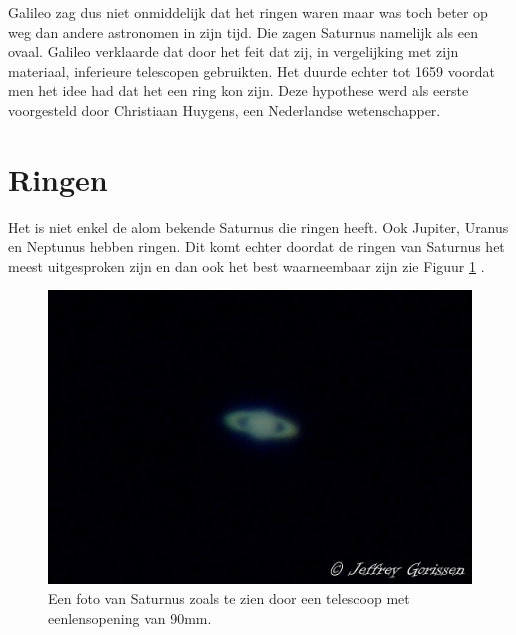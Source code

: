 \documentclass[a4paper]{article}
\begin{document}
\noindent
	Galileo zag dus niet onmiddelijk dat het ringen waren maar was toch beter op weg dan andere astronomen in zijn tijd.
	Die zagen Saturnus namelijk als een ovaal. Galileo verklaarde dat door het feit dat zij, in vergelijking met zijn materiaal,
	inferieure telescopen gebruikten. Het duurde echter tot 1659 voordat men het idee had
	dat het een ring kon zijn. Deze hypothese werd als eerste voorgesteld door Christiaan Huygens, een Nederlandse wetenschapper.
\section{Ringen}
Het is niet enkel de alom bekende Saturnus die ringen heeft. Ook Jupiter, Uranus en Neptunus hebben ringen. Dit komt echter doordat de ringen van Saturnus het meest uitgesproken zijn en
dan ook het best waarneembaar zijn zie Figuur \ref{fig:Saturnus} .
\begin{figure}[h]
	\centering 
	\includegraphics[scale=0.345]{img/goed-P1030276.JPG} 
	\caption{Een foto van Saturnus zoals te zien door een telescoop met een\newline lensopening van 90mm.}
	\label{fig:Saturnus}
\end{figure}
\newpage
\end{document}
